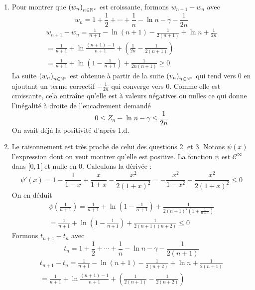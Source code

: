 \begin{enumerate}
\item Pour montrer que $\left(w_n \right)_{n\in\mathbb{N}^*}$ est croissante, formons $w_{n+1}-w_n$ avec 
\begin{displaymath}
 w_n = 1+\frac{1}{2}+\cdots+\frac{1}{n}-\ln n -\gamma -\frac{1}{2n}
\end{displaymath}
\begin{multline*}
 w_{n+1}-w_n = \frac{1}{n+1}-\ln(n+1)-\frac{1}{2(n+1)}+\ln n +\frac{1}{2n}\\
= \frac{1}{n+1} +\ln \frac{(n+1)-1}{n+1}+\left(\frac{1}{2n}-\frac{1}{2(n+1)} \right) \\
= \frac{1}{n+1}+\ln\left(1-\frac{1}{n+1}\right)+\frac{1}{2n(n+1)}\geq 0 
\end{multline*}
La suite $\left(w_n \right)_{n\in\mathbb{N}^*}$ est obtenue à partir de la suite $\left(v_n \right)_{n\in\mathbb{N}^*}$ qui tend vers $0$ en ajoutant un terme correctif $-\frac{1}{2n}$ qui converge vers $0$. Comme elle est croissante, cela entraîne qu'elle est à valeurs négatives ou nulles ce qui donne l'inégalité à droite de l'encadrement demandé
\begin{displaymath}
 0\leq Z_n-\ln n-\gamma\leq \frac{1}{2n}
\end{displaymath}
On avait déjà la positivité d'après 1.d.
\item Le raisonnement est très proche de celui des questions 2. et 3. Notons $\psi(x)$ l'expression dont on veut montrer qu'elle est positive. La fonction $\psi$ est $\mathcal C^\infty$ dans $[0,1[$ et nulle en $0$. Calculons la dérivée :
\begin{displaymath}
 \psi'(x)=1-\frac{1}{1-x}+\frac{x}{1+x}-\frac{x^2}{2(1+x)^2}
= -\frac{x^2}{1-x^2}-\frac{x^2}{2(1+x)^2} \leq 0
\end{displaymath}
On en déduit
\begin{multline*}
 \psi(\frac{1}{n+1})=\frac{1}{n+1} +\ln (1-\frac{1}{n+1})+\frac{1}{2(n+1)^2(1+\frac{1}{n+1})}\\
= \frac{1}{n+1} +\ln (1-\frac{1}{n+1})+\frac{1}{2(n+1)(n+2)}\leq 0
\end{multline*}
Formons $t_{n+1}-t_n$ avec 
\begin{displaymath}
 t_n = 1+\frac{1}{2}+\cdots+\frac{1}{n}-\ln n -\gamma -\frac{1}{2(n+1)}
\end{displaymath}
\begin{multline*}
 t_{n+1}-t_n = \frac{1}{n+1}-\ln(n+1)-\frac{1}{2(n+2)}+\ln n +\frac{1}{2(n+1)}\\
= \frac{1}{n+1} +\ln \frac{(n+1)-1}{n+1}+\left(\frac{1}{2(n+1)}-\frac{1}{2(n+2)} \right) \\

\end{multline*}
\end{enumerate}
